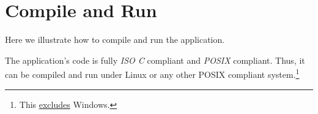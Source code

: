 \chapter{Compile and Run}\label{appendix:howto}

Here we illustrate how to compile and run the application.

The application's code is fully \emph{ISO C} compliant and \emph{POSIX}
compliant. Thus, it can be compiled and run under Linux or any other
POSIX compliant system.\footnote{This \underline{excludes} Windows.}



